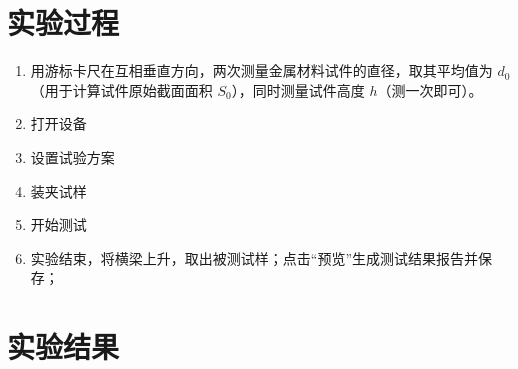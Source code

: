 \documentclass[a4paper,utf8]{article}
\begin{document}
\section{实验过程}%
    \begin{enumerate}
        \item 用游标卡尺在互相垂直方向，两次测量金属材料试件的直径，取其平均值为 $d_0$（用于计算试件原始截面面积 $S_0$），同时测量试件高度 $h$（测一次即可）。
        \item 打开设备
        \item 设置试验方案
        \item 装夹试样
        \item 开始测试
        \item 实验结束，将横梁上升，取出被测试样；点击“预览”生成测试结果报告并保存；
    \end{enumerate}
\section{实验结果}
\end{document}
